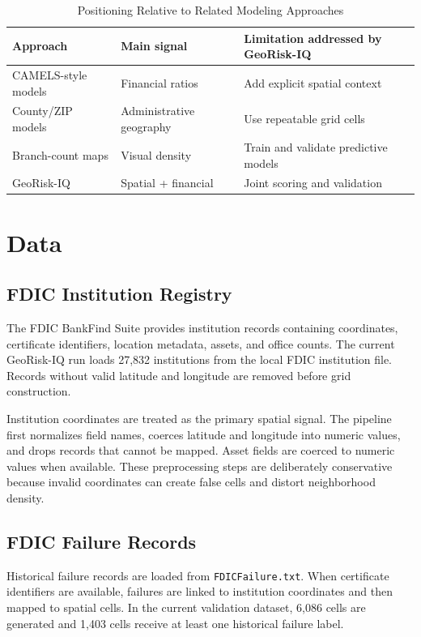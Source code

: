 \documentclass[conference]{IEEEtran}
\begin{document}
\begin{table}[t]
\caption{Positioning Relative to Related Modeling Approaches}
\label{tab:positioning}
\centering
\begin{tabular}{p{}p{}p{}}
\toprule
Approach & Main signal & Limitation addressed by GeoRisk-IQ \\
\midrule
CAMELS-style models & Financial ratios & Add explicit spatial context \\
County/ZIP models & Administrative geography & Use repeatable grid cells \\
Branch-count maps & Visual density & Train and validate predictive models \\
GeoRisk-IQ & Spatial + financial & Joint scoring and validation \\
\bottomrule
\end{tabular}
\end{table}

\section{Data}
\subsection{FDIC Institution Registry}
The FDIC BankFind Suite provides institution records containing coordinates,
certificate identifiers, location metadata, assets, and office counts. The
current GeoRisk-IQ run loads 27,832 institutions from the local FDIC
institution file. Records without valid latitude and longitude are removed
before grid construction.

Institution coordinates are treated as the primary spatial signal. The
pipeline first normalizes field names, coerces latitude and longitude into
numeric values, and drops records that cannot be mapped. Asset fields are
coerced to numeric values when available. These preprocessing steps are
deliberately conservative because invalid coordinates can create false
cells and distort neighborhood density.

\subsection{FDIC Failure Records}
Historical failure records are loaded from \texttt{FDICFailure.txt}. When
certificate identifiers are available, failures are linked to institution
coordinates and then mapped to spatial cells. In the current validation
dataset, 6,086 cells are generated and 1,403 cells receive at least one
historical failure label.
\end{document}
